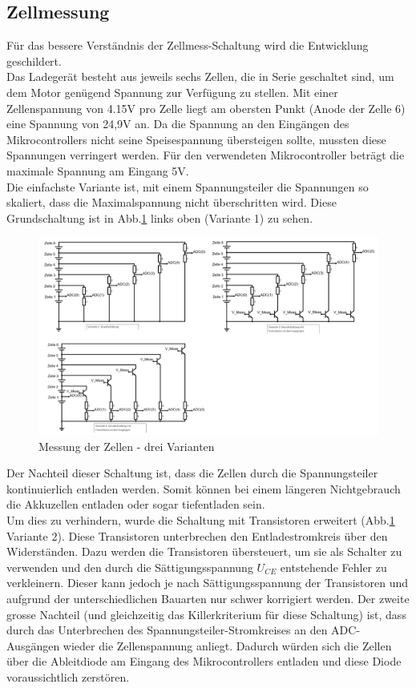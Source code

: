 \subsection*{Zellmessung}
Für das bessere Verständnis der Zellmess-Schaltung wird die Entwicklung geschildert. \\
Das Ladegerät besteht aus jeweils sechs Zellen, die in Serie geschaltet sind, um dem Motor genügend Spannung zur Verfügung zu stellen. Mit einer Zellenspannung von 4.15V pro Zelle liegt am obersten Punkt (Anode der Zelle 6) eine Spannung von 24,9V an. Da die Spannung an den Eingängen des Mikrocontrollers nicht seine Speisespannung übersteigen sollte, mussten diese Spannungen verringert werden. Für den verwendeten Mikrocontroller beträgt die maximale Spannung am Eingang 5V.
\\
Die einfachste Variante ist, mit einem Spannungsteiler die Spannungen so skaliert, dass die Maximalspannung nicht überschritten wird. Diese Grundschaltung ist in Abb.\ref{fig:zellmessung} links oben (Variante 1) zu sehen. 
\begin{figure} [H]
	\centering
	\includegraphics[width=1\linewidth]{images/Zellmessung_var}
	\caption{Messung der Zellen - drei Varianten}
	\label{fig:zellmessung}
\end{figure}
Der Nachteil dieser Schaltung ist, dass die Zellen durch die Spannungsteiler kontinuierlich entladen werden. Somit können bei einem längeren Nichtgebrauch die Akkuzellen entladen oder sogar tiefentladen sein. \\
Um dies zu verhindern, wurde die Schaltung mit Transistoren erweitert (Abb.\ref{fig:zellmessung} Variante 2). Diese Transistoren unterbrechen den Entladestromkreis über den Widerständen. Dazu werden die Transistoren übersteuert, um sie als Schalter zu verwenden und den durch die Sättigungsspannung $U_{CE}$ entstehende Fehler zu verkleinern. Dieser kann jedoch je nach Sättigungsspannung der Transistoren und aufgrund der unterschiedlichen Bauarten nur schwer korrigiert werden. Der zweite grosse Nachteil (und gleichzeitig das Killerkriterium für diese Schaltung) ist, dass durch das Unterbrechen des Spannungsteiler-Stromkreises an den ADC-Ausgängen wieder die Zellenspannung anliegt. Dadurch würden sich die Zellen über die Ableitdiode am Eingang des Mikrocontrollers entladen und diese Diode voraussichtlich zerstören. \\
